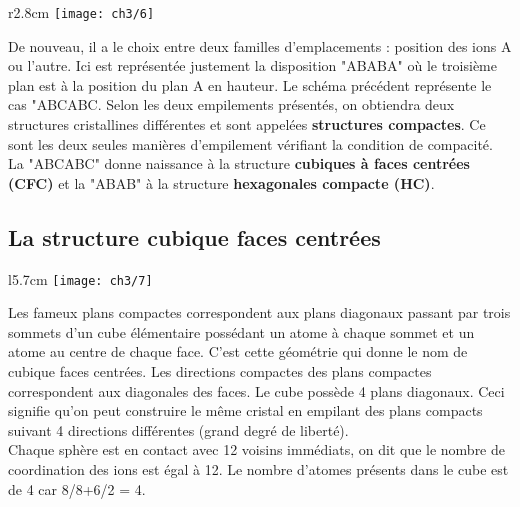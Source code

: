 			\begin{wrapfigure}[4]{r}{2.8cm}
			\vspace{-8mm}
			\texttt{[image: ch3/6]}
			\end{wrapfigure}
			De nouveau, il a le choix entre deux familles d'emplacements : position des ions A ou l'autre. Ici est représentée justement la disposition "ABABA" où le troisième plan est à la position du plan A en hauteur. Le schéma précédent représente le cas "ABCABC. Selon les deux empilements présentés, on obtiendra deux structures cristallines différentes et sont appelées \textbf{structures compactes}. Ce sont les deux seules manières d'empilement vérifiant la condition de compacité.
			La "ABCABC" donne naissance à la structure \textbf{cubiques à faces centrées (CFC)} et la "ABAB" à la structure \textbf{hexagonales compacte (HC)}.
			
		\subsection{La structure cubique faces centrées}
			\begin{wrapfigure}[5]{l}{5.7cm}
			\vspace{-5mm}
			\texttt{[image: ch3/7]}
			\end{wrapfigure}
			Les fameux plans compactes correspondent aux plans diagonaux passant par trois sommets d'un cube élémentaire possédant un atome à chaque sommet et un atome au centre de chaque face. C'est cette géométrie qui donne le nom de cubique faces centrées. Les directions compactes des plans compactes correspondent aux diagonales des faces. Le cube possède 4 plans diagonaux. Ceci signifie qu'on peut construire le même cristal en empilant des plans compacts suivant 4 directions différentes (grand degré de liberté). \\
			Chaque sphère est en contact avec 12 voisins immédiats, on dit que le nombre de coordination des ions est égal à 12. Le nombre d'atomes présents dans le cube est de 4 car 8/8+6/2 = 4.\\
			
